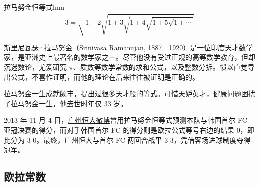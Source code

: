\documentclass[12pt, cn]{elegantart}
\begin{document}
\begin{theorem}{拉马努金恒等式}{lmu}
	\begin{equation}
		3=\sqrt{1+2 \sqrt{1+3 \sqrt{1+4 \sqrt{1+5 \sqrt{1+\cdots}}}}}
	\end{equation}

	斯里尼瓦瑟·拉马努金（Srinivasa Ramanujan, 1887－1920）是一位印度天才数学家，是亚洲史上最著名的数学家之一。尽管他没有受过正规的高等数学教育，但却沉迷数论，尤爱研究 $\pi$、质数等数学常数的求和公式，以及整数分拆。惯以直觉导出公式，不喜作证明，而他的理论在后来往往被证明是正确的。

	拉马努金一生成就颇丰，提出过很多天才般的等式。可惜天妒英才，健康问题困扰了拉马努金一生，他去世时年仅 33 岁。
	
	2013 年 11 月 4 日，\href{https://www.weibo.com/1894798092/Ah8QTrRae}{广州恒大微博}曾用拉马努金恒等式预测本队与韩国首尔 FC 亚冠决赛的得分，而对手韩国首尔 FC 的得分则是欧拉公式等号右边的结果 0，即比分为 3-0。最终，广州恒大与首尔 FC 两回合战平 3-3，凭借客场进球制度夺得冠军。
\end{theorem}

\subsection{欧拉常数}
\end{document}

